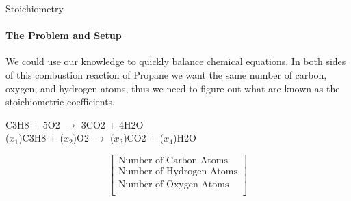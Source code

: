 \documentclass{beamer}
\begin{document}
\begin{frame}{Stoichiometry}
\framesubtitle{The Problem and Setup}
We could use our knowledge to quickly balance chemical equations. In both sides of this combustion reaction of Propane we want the same number of carbon, oxygen, and hydrogen atoms, thus we need to figure out what are known as the stoichiometric coefficients.

{\tiny 
\begin{center}
    C3H8 + 5O2 $\xrightarrow{}$ 3CO2 + 4H2O  \\
    ($x_1$)C3H8 + ($x_2$)O2 $\xrightarrow{}$ ($x_3$)CO2 + ($x_4$)H2O
\end{center}

\[
\begin{bmatrix}
    \text{Number of Carbon Atoms} \\
    \text{Number of Hydrogen Atoms} \\
    \text{Number of Oxygen Atoms} \\
\end{bmatrix}
\]

}
\end{frame}
\end{document}
